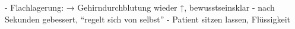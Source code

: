 
\begin{itemize}
  -   Flachlagerung: → Gehirndurchblutung
  wieder ↑, bewusstseinsklar
  -   nach Sekunden gebessert, \enquote{regelt sich von
  selbst}
  -   Patient sitzen lassen, Flüssigkeit
\end{itemize}